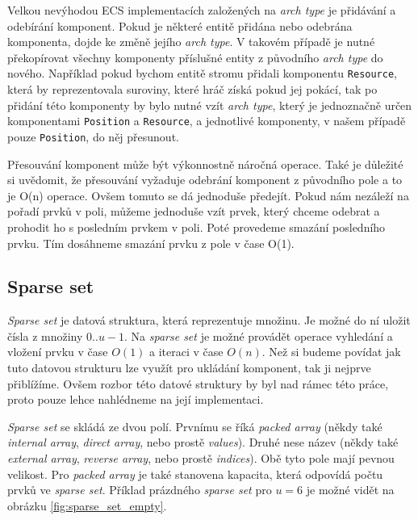 Velkou nevýhodou ECS implementacích založených na \textit{arch type} je přidávání a odebírání komponent. Pokud je některé entitě přidána nebo odebrána komponenta, dojde ke změně jejího \textit{arch type}. V takovém případě je nutné překopírovat všechny komponenty příslušné entity z původního \textit{arch type} do nového. Například pokud bychom entitě stromu přidali komponentu \verb|Resource|, která by reprezentovala suroviny, které hráč získá pokud jej pokácí, tak po přidání této komponenty by bylo nutné vzít \textit{arch type}, který je jednoznačně určen komponentami \verb|Position| a \verb|Resource|, a jednotlivé komponenty, v našem případě pouze \verb|Position|, do něj přesunout.

Přesouvání komponent může být výkonnostně náročná operace. Také je důležité si uvědomit, že přesouvání vyžaduje odebrání komponent z původního pole a to je O(n) operace. Ovšem tomuto se dá jednoduše předejít. Pokud nám nezáleží na pořadí prvků v poli, můžeme jednoduše vzít prvek, který chceme odebrat a prohodit ho s posledním prvkem v poli. Poté provedeme smazání posledního prvku. Tím dosáhneme smazání prvku z pole v čase O(1).

\subsection{Sparse set}


\textit{Sparse set} je datová struktura, která reprezentuje množinu. Je možné do ní uložit čísla z množiny $0..u-1$. Na \textit{sparse set} je možné provádět operace vyhledání a vložení prvku v čase $O(1)$ a iteraci v čase $O(n)$. Než si budeme povídat jak tuto datovou strukturu lze využít pro ukládání komponent, tak ji nejprve přiblížíme. Ovšem rozbor této datové struktury by byl nad rámec této práce, proto pouze lehce nahlédneme na její implementaci.

\textit{Sparse set} se skládá ze dvou polí. Prvnímu se říká \textit{packed array} (někdy také \textit{internal array}, \textit{direct array}, nebo prostě \textit{values}). Druhé nese název  (někdy také \textit{external array}, \textit{reverse array}, nebo prostě \textit{indices}). Obě tyto pole mají pevnou velikost. Pro \textit{packed array} je také stanovena kapacita, která odpovídá počtu prvků ve \textit{sparse set}. Příklad prázdného \textit{sparse set} pro $u=6$ je možné vidět na obrázku \ref{fig:sparse_set_empty}. 

